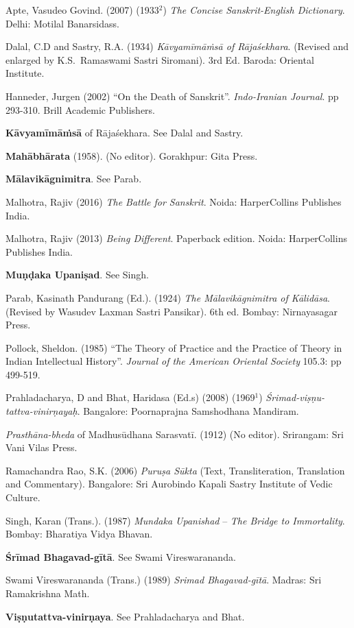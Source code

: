 \begin{thebibliography}{99}
\itemsep=2pt
Apte, Vasudeo Govind. (2007) (1933$^{2}$) \textsl{The Concise Sanskrit-English Dictionary}. Delhi: Motilal Banarsidass.

Dalal, C.D and Sastry, R.A. (1934) \textsl{Kāvyamīmāṁsā of Rājaśekhara}. (Revised and enlarged by K.S.~Ramaswami Sastri Siromani). 3rd Ed. Baroda: Oriental Institute.

Hanneder, Jurgen (2002) ``On the Death of Sanskrit''. \textsl{Indo-Iranian Journal}. pp 293-310. Brill Academic Publishers. 

\textbf{Kāvyamīmāṁsā} of Rājaśekhara. See Dalal and Sastry. 


{\bf Mahābhārata} (1958). (No editor). Gorakhpur: Gita Press.

\textbf{Mālavikāgnimitra}. See Parab. 

Malhotra, Rajiv (2016) \textsl{The Battle for Sanskrit}. Noida: HarperCollins Publishes India.

Malhotra, Rajiv (2013) \textsl{Being Different}. Paperback edition. Noida: HarperCollins Publishes India.

\textbf{Muṇḍaka Upaniṣad}. See Singh. 

Parab, Kasinath Pandurang (Ed.). (1924) \textsl{The Mālavikāgnimitra of Kālidāsa}. (Revised by Wasudev Laxman Sastri Pansikar). 6th ed. Bombay: Nirnayasagar Press.

Pollock, Sheldon. (1985) ``The Theory of Practice and the Practice of Theory in Indian Intellectual History''. \textsl{Journal of the American Oriental Society} 105.3: pp 499-519.

Prahladacharya, D and Bhat, Haridasa (Ed.s) (2008) (1969$^{1}$) \textsl{Śrimad-viṣṇu-tattva-vinirṇayaḥ}. Bangalore: Poornaprajna Samshodhana Mandiram.

{\it Prasthāna-bheda} of Madhusūdhana Sarasvatī. (1912) (No editor). Srirangam: Sri Vani Vilas Press.

Ramachandra Rao, S.K. (2006) \textsl{Puruṣa Sūkta} (Text, Transliteration, Translation and Commentary). Bangalore: Sri Aurobindo Kapali Sastry Institute of Vedic Culture. 

Singh, Karan (Trans.). (1987) \textsl{Mundaka Upanishad} -- \textsl{The Bridge to Immortality}. Bombay: Bharatiya Vidya Bhavan.

\textbf{Śrīmad Bhagavad-gītā}. See Swami Vireswarananda. 

Swami Vireswarananda (Trans.) (1989) \textsl{Srimad Bhagavad-gītā}. Madras: Sri Ramakrishna Math.

\textbf{Viṣṇutattva-vinirṇaya}. See Prahladacharya and Bhat.
\end{thebibliography}
\label{chapter\thechapter:end}
